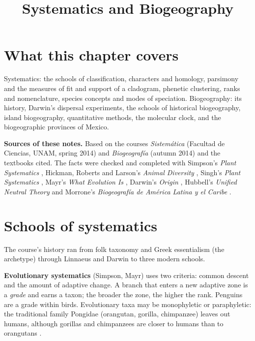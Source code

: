 



\title{Systematics and Biogeography}
\maketitle

\label{section-phantom}

\tableofcontents

\section{What this chapter covers}
\label{section-overview}

Systematics: the schools of classification,
characters and homology, parsimony and the
measures of fit and support of a
cladogram, phenetic clustering, ranks and
nomenclature, species concepts and modes
of speciation. Biogeography: its history,
Darwin's dispersal experiments, the
schools of historical biogeography, island
biogeography, quantitative methods, the
molecular clock, and the biogeographic
provinces of Mexico.

\textbf{Sources of these notes.}
Based on the courses
\emph{Sistem\'atica} (Facultad de Ciencias, UNAM,
spring 2014) and \emph{Biogeograf\'ia}
(autumn 2014) and the textbooks cited.
The facts were checked and
completed with Simpson's \emph{Plant
Systematics} \cite{simpson2006plant},
Hickman, Roberts and Larson's \emph{Animal
Diversity} \cite{hickman2002animal},
Singh's \emph{Plant Systematics}
\cite{singh2010plant}, Mayr's \emph{What
Evolution Is} \cite{mayr2002evolution},
Darwin's \emph{Origin}
\cite{darwin2008origin}, Hubbell's
\emph{Unified Neutral Theory}
\cite{hubbell2001unified} and Morrone's
\emph{Biogeograf\'ia de Am\'erica Latina y
el Caribe} \cite{morrone2001biogeografia}.

\section{Schools of systematics}
\label{section-schools}

The course's history ran from folk
taxonomy and Greek essentialism (the
archetype) through Linnaeus and Darwin to
three modern schools.

\textbf{Evolutionary systematics}
(Simpson, Mayr) uses two criteria: common
descent and the amount of adaptive change.
A branch that enters a new adaptive zone is
a \emph{grade} and earns a taxon; the
broader the zone, the higher the rank.
Penguins are a grade within birds.
Evolutionary taxa may be monophyletic or
paraphyletic: the traditional family
Pongidae (orangutan, gorilla, chimpanzee)
leaves out humans, although gorillas and
chimpanzees are closer to humans than to
orangutans
\cite[Chapter 4]{hickman2002animal}.

